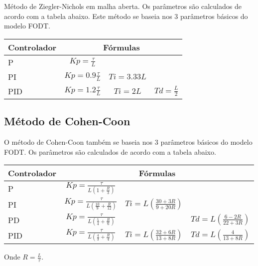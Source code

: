         Método de Ziegler-Nichols em malha aberta. Os parâmetros são calculados
        de acordo com a tabela abaixo. Este método se baseia nos 3 parâmetros
        básicos do modelo \acs{FODT}.
        
        \newpage
        
        \begin{center}
            \begin{tabular}{l*{3}{c}}
Controlador & \multicolumn{3}{c}{Fórmulas} \\
\hline
P   & $Kp = \frac{\tau}{L}$     &              & \\
PI  & $Kp = 0.9 \frac{\tau}{L}$ & $Ti = 3.33L$ & \\
PID & $Kp = 1.2 \frac{\tau}{L}$ & $Ti = 2L$ & $Td = \frac{L}{2}$ \\
            \end{tabular}
        \end{center}
    
    \subsection{Método de Cohen-Coon}
        
        O método de Cohen-Coon também se baseia nos 3 parâmetros básicos
        do modelo \acs{FODT}. Os parâmetros são calculados de acordo com
        a tabela abaixo.
        
        \begin{center}
            \begin{tabular}{l*{3}{c}}
Controlador & \multicolumn{3}{c}{Fórmulas} \\
\hline
P   & $Kp = \frac{\tau}{L(1 + \frac{R}{3})}$             &              & \\
PI  & $Kp = \frac{\tau}{L(\frac{10}{9} + \frac{R}{12})}$ & $Ti = L(\frac{30+3R}{9+20R})$ & \\
PD  & $Kp = \frac{\tau}{L(\frac{5}{4} + \frac{R}{6})}$ & & $Td = L(\frac{6-2R}{22+3R})$ \\
PID & $Kp = \frac{\tau}{L(\frac{4}{3} + \frac{R}{4})}$ & $Ti = L(\frac{32+6R}{13+8R})$ & $Td = L(\frac{4}{13+8R})$ \\
            \end{tabular}
        \end{center}
    
    Onde $R = \frac{L}{\tau}$.
    
